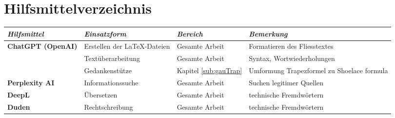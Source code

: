 \chapter*{Hilfsmittelverzeichnis}
\label{cha:tools} %

\begingroup
\fontsize{12pt}{14pt}\selectfont

\newcommand{\tabTitle}[1]{\textbf{\textit{\large #1}}}
\renewcommand{\arraystretch}{1.5} %

\begin{table}[H]
    \centering
    \begin{tabularx}{\textwidth}{|l|X|X|X|}
        \hline
        \tabTitle{Hilfsmittel} & \tabTitle{Einsatzform} & \tabTitle{Bereich} & \tabTitle{Bemerkung} \\
        \hline

        \textbf{ChatGPT (OpenAI)} & Erstellen der LaTeX-Dateien & Gesamte Arbeit & Formatieren des Fliesstextes \\
         & Textüberarbeitung & Gesamte Arbeit & Syntax, Wortwiederholungen \\ 
         & Gedankenstütze & Kapitel \ref{sub:gauTrap} & Umformung Trapezformel zu Shoelace formula \cite{oai:chatgpt} \\
        \hline
        \textbf{Perplexity AI} & Informationssuche & Gesamte Arbeit & Suchen legitimer Quellen \\
        \hline
        \textbf{DeepL} & Übersetzen & Gesamte Arbeit & technische Fremdwörtern \\
        \hline
        \textbf{Duden} & Rechtschreibung & Gesamte Arbeit & technische Fremdwörtern \\
        \hline
    \end{tabularx}
        \label{tab:tools}
\end{table}

\renewcommand{\arraystretch}{1.0}

\endgroup